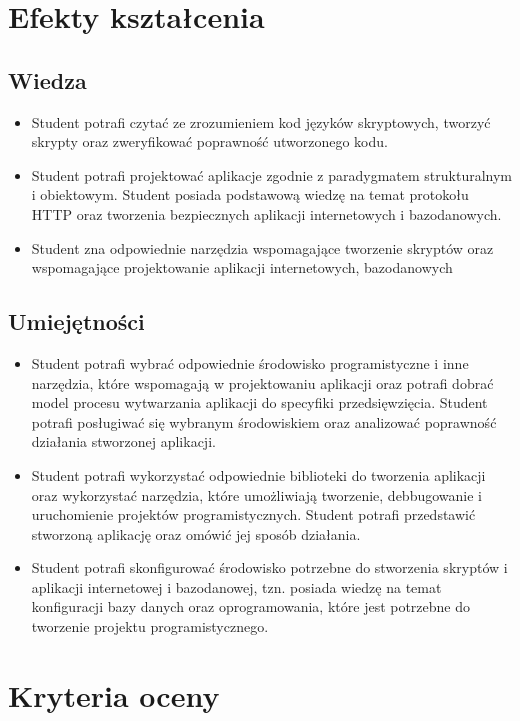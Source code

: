 \documentclass[12pt, a4paper]{article}
\begin{document}
\section{Efekty kształcenia}

\subsection*{Wiedza}
\begin{itemize}
  \item Student potrafi  czytać ze zrozumieniem kod języków skryptowych,  tworzyć skrypty  oraz zweryfikować poprawność utworzonego kodu.
  \item Student potrafi projektować aplikacje  zgodnie z paradygmatem strukturalnym i obiektowym. Student posiada podstawową wiedzę na temat protokołu HTTP oraz tworzenia bezpiecznych aplikacji internetowych i bazodanowych.
  \item Student zna odpowiednie narzędzia wspomagające tworzenie skryptów oraz wspomagające projektowanie aplikacji internetowych, bazodanowych
\end{itemize}

\subsection*{Umiejętności}
\begin{itemize}
  \item Student potrafi wybrać odpowiednie środowisko programistyczne i inne narzędzia, które wspomagają w projektowaniu aplikacji oraz potrafi dobrać model procesu wytwarzania aplikacji  do specyfiki przedsięwzięcia. Student potrafi posługiwać się wybranym środowiskiem oraz analizować poprawność działania stworzonej aplikacji.
  \item Student potrafi wykorzystać odpowiednie biblioteki do tworzenia aplikacji oraz wykorzystać narzędzia, które umożliwiają tworzenie,  debbugowanie i uruchomienie projektów programistycznych. Student potrafi przedstawić stworzoną aplikację oraz omówić jej sposób działania.
  \item Student potrafi skonfigurować środowisko potrzebne do stworzenia skryptów i aplikacji internetowej i bazodanowej, tzn. posiada wiedzę na temat konfiguracji bazy danych oraz oprogramowania, które jest potrzebne do tworzenie projektu programistycznego.
\end{itemize}

\section{Kryteria oceny}
\end{document}
